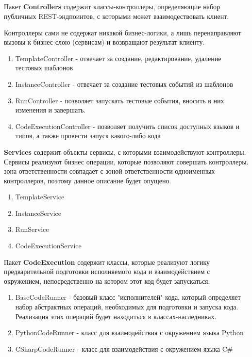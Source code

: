 \documentclass{article}
\begin{document}
    \subsection{} Пакет \textbf{Controllers} содержит классы-контроллеры, определяющие набор публичных REST-эндпоинтов, с которыми может взаимодествовать клиент.\par
    Контроллеры сами не содержат никакой бизнес-логики, а лишь перенаправляют вызовы к бизнес-слою (сервисам) и возвращают результат клиенту.    \begin{enumerate}
        \item TemplateController - отвечает за создание, редактирование, удаление тестовых шаблонов
        \item InstanceController - отвечает за создание тестовых событий из шаблонов
        \item RunController - позволяет запускать тестовые события, вносить в них изменения и завершать.
        \item CodeExecutionController - позволяет получить список доступных языков и типов, а также провести запуск какого-либо кода
    \end{enumerate}
     \textbf{Services} содержит объекты сервисы, с которыми взаимодействуют контроллеры.
    Сервисы реализуют бизнес операции, которые позволяют совершать контроллеры.
     зона ответственности совпадает с зоной ответственности одноименных контроллеров, поэтому 
    данное описание будет опущено.
    \begin{enumerate}
        \item TemplateService
        \item InstanceService
        \item RunService
        \item CodeExecutionService
    \end{enumerate}
    \par
    Пакет \textbf{CodeExecution} содержит классы, которые реализуют логику предварительной подготовки исполняемого кода и взаимодействием с окружением, непосредственно на котором этот код будет запускаться.
    \begin{enumerate}
        \item BaseCodeRunner - базовый класс "исполнителей" кода, который определяет набор абстрактных
        операций, необходимых для подготовки и запуска кода. Реализация этих операций будет находиться в классах-наследниках.
        \item PythonCodeRunner - класс для взаимодействия с окружением языка Python
        \item CSharpCodeRunner - класс для взаимодействия с окружением языка C\#
    \end{enumerate}
    
\end{document}
